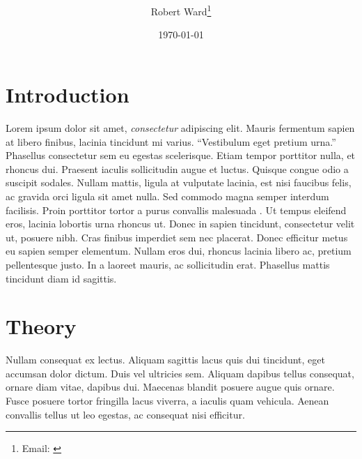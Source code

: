 \documentclass[12pt,letterpaper]{article} %
\begin{document}
	\onehalfspacing
	\title{\textbf{\papertitle}}
	\author{Robert Ward\thanks{Email: \href{mailto:\myemail}{\myemail}} }
	\affil{\myaffiliation}
	\date{\today}
	\maketitle
	\begin{abstract}

		
	\end{abstract}
	
	
	\clearpage

	\section*{Introduction}
	

	
	Lorem ipsum dolor sit amet, \emph{consectetur} adipiscing elit. Mauris fermentum sapien at libero finibus, lacinia tincidunt mi varius. \enquote{Vestibulum eget pretium urna.} Phasellus consectetur sem eu egestas scelerisque. Etiam tempor porttitor nulla, et rhoncus dui. Praesent iaculis sollicitudin augue et luctus. Quisque congue odio a suscipit sodales. Nullam mattis, ligula at vulputate lacinia, est nisi faucibus felis, ac gravida orci ligula sit amet nulla. Sed commodo magna semper interdum facilisis. Proin porttitor tortor a purus convallis malesuada \citep{leahey_prominent_2017}. Ut tempus eleifend eros, lacinia lobortis urna rhoncus ut. Donec in sapien tincidunt, consectetur velit ut, posuere nibh. Cras finibus imperdiet sem nec placerat. Donec efficitur metus eu sapien semper elementum. Nullam eros dui, rhoncus lacinia libero ac, pretium pellentesque justo. In a laoreet mauris, ac sollicitudin erat. Phasellus mattis tincidunt diam id sagittis.
	
	\section*{Theory}
	Nullam consequat ex lectus. Aliquam sagittis lacus quis dui tincidunt, eget accumsan dolor dictum. Duis vel ultricies sem. Aliquam dapibus tellus consequat, ornare diam vitae, dapibus dui. Maecenas blandit posuere augue quis ornare. Fusce posuere tortor fringilla lacus viverra, a iaculis quam vehicula. Aenean convallis tellus ut leo egestas, ac consequat nisi efficitur.
	
\end{document}

